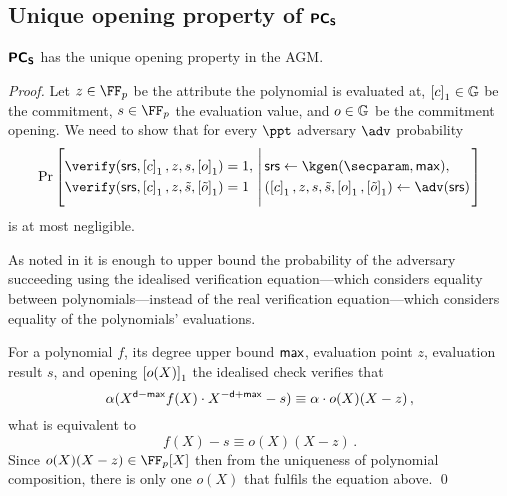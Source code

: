 \documentclass[runningheads,10pt]{llncs}
\begin{document}
\subsection{Unique opening property of $\bm{\mathsf{PC}}_{\bm{\mathsf{S}}}$}
\begin{lemma}
\label{lem:pcoms_unique_op}
$\bm{\mathsf{PC}}_{\bm{\mathsf{S}}}$ has the unique opening property in the AGM. 
\end{lemma}
\begin{proof}
Let 
$z \in \FF_p$ be the attribute the polynomial is evaluated at,
$\left[c\right]_{1} \in \mathbb{G}$ be the commitment,  
$s \in \FF_p$ the evaluation value, and 
$o \in \mathbb{G}$ be the commitment opening. 
We need to show that for every $\ppt$ adversary $\adv$ probability
\[
  \Pr \left[
    \begin{aligned}
      & \verify(\srs, \gone{c}, z, s, \gone{o}) = 1, \\
      & \verify(\srs, \gone{c}, z, \tilde{s}, \gone{\tilde{o}}) = 1
    \end{aligned}
    \,\left|\, \vphantom{\begin{aligned}
          & \verify(\srs, \gone{c}, z, s, \gone{o}),\\
          & \verify(\srs, \gone{c}, z, \tilde{s}, \gone{\tilde{o}}) \\
          &o \neq \tilde{o})
		\end{aligned}}
      \begin{aligned}
        & \srs \gets \kgen(\secparam, \maxdeg), \\
        & (\gone{c}, z, s, \tilde{s}, \gone{o}, \gone{\tilde{o}}) \gets \adv(\srs)
      \end{aligned}
    \right.\right]
\]
is at most negligible.

As noted in \cite[Lemma 2.2]{EPRINT:GabWilCio19} it is enough to upper bound the
probability of the adversary succeeding using the idealised verification
equation---which considers equality between polynomials---instead of the real
verification equation---which considers equality of the polynomials' evaluations.

For a polynomial $f$, its degree upper bound $\mathsf{max}$, evaluation point $z$,
evaluation result $s$, and opening $\left[o(X)\right]_{1}$ the idealised check verifies that
\begin{equation}
  \alpha (X^{\mathsf{d} - \mathsf{max}}f(X) \cdot X^{-\mathsf{d} + \mathsf{max}} -  s) \equiv \alpha \cdot o(X) (X - z)\,,
\end{equation}
what is equivalent to 
\begin{equation}
	f(X) -  s \equiv o(X) (X - z)\,.
	\label{eq:pcoms_idealised_check}
\end{equation}
Since $o(X)(X - z) \in \FF_p[X]$ then from the uniqueness of polynomial
composition, there is only one $o(X)$ that fulfils the equation above.
\qed
\end{proof}
\end{document}
